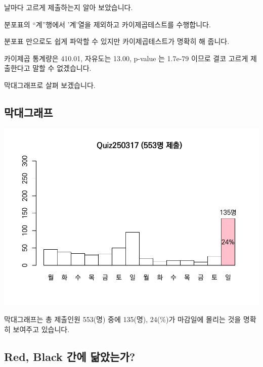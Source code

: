 \documentclass[
]{book}
\begin{document}
날마다 고르게 제출하는지 알아 보았습니다.

분포표의 ``계''행에서 '계'열을 제외하고 카이제곱테스트를 수행합니다.

분포표 만으로도 쉽게 파악할 수 있지만 카이제곱테스트가 명확히 해 줍니다.

카이제곱 통계량은 410.01, 자유도는 13.00, p-value 는 1.7e-79 이므로 결코 고르게 제출한다고 말할 수 없겠습니다.

막대그래프로 살펴 보겠습니다.

\subsection{막대그래프}\label{uxb9c9uxb300uxadf8uxb798uxd504-3}

\includegraphics{_main_files/figure-latex/unnamed-chunk-75-1.pdf}

막대그래프는 총 제출인원 553(명) 중에 135(명), 24(\%)가 마감일에 몰리는 것을 명확히 보여주고 있습니다.

\subsection{Red, Black 간에 닮았는가?}\label{red-black-uxac04uxc5d0-uxb2eeuxc558uxb294uxac00-2}
\end{document}
